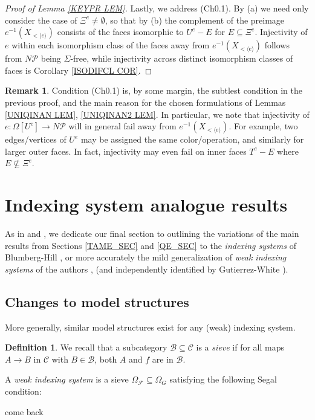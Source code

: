 \documentclass[a4paper,10pt
,draft
]{article}%
\numberwithin{equation}{section}
\numberwithin{figure}{section}
\theoremstyle{definition} %
\newtheorem{definition}[equation]{Definition}%
\newtheorem{remark}[equation]{Remark}%
\newcommand{\F}{\ensuremath{\mathcal F}}
\newcommand{\1}{\ensuremath{\mathbbm 1}}%
\begin{document}
\begin{proof}[Proof of Lemma \ref{KEYPR LEM}]
	
	Lastly, we address (Ch0.1). By (a) we need only consider the case of $\Xi^e \neq \emptyset$,
	so that by (b)
	the complement of
	the preimage
	$e^{-1}(X_{<\langle e\rangle})$
	consists of the faces isomorphic to
	$U^e-E$ for $E \subseteq \Xi^e$.
	Injectivity of $e$ within each isomorphism class of the faces away from %
	$e^{-1}(X_{<\langle e\rangle})$
	follows from $N \mathcal{P}$ being $\Sigma$-free,
	while injectivity across distinct isomorphism classes of faces is
	Corollary \ref{ISODIFCL COR}.
\end{proof}



\begin{remark}
	Condition (Ch0.1) is, by some margin, the subtlest condition in the previous proof, and the main reason for the chosen formulations of 
	Lemmas \ref{UNIQINAN LEM}, \ref{UNIQINAN2 LEM}.
	In particular, we note that injectivity of 
	$e \colon \Omega[U^e] \to N \mathcal{P}$ will in general fail away from 
	$e^{-1}(X_{< \langle e \rangle})$.
	For example, two edges/vertices of $U^e$
	may be assigned the same color/operation, and similarly for larger outer faces. In fact, injectivity may even fail on inner faces
	$T^e-E$ where $E \not \subseteq \Xi^e$.
\end{remark}









\iffalse




\section{Indexing system analogue results}\label{INDSYS SEC}

As in \cite[\S 6]{BP_edss} and \cite[\S 9]{Per18}, we dedicate our final section to 
outlining the variations of the main results from Sections \ref{TAME_SEC} and \ref{QE_SEC} to
the \textit{indexing systems} of Blumberg-Hill \cite{BH15}, or more accurately
the mild generalization of \textit{weak indexing systems} of the authors \cite[\S 9]{Per18}, \cite[\S4.4]{BP_geo} (and independently identified by Gutierrez-White \cite{GW18}).


\subsection{Changes to model structures}
More generally, similar model structures exist for any (weak) indexing system.
\begin{definition}
      We recall that a subcategory $\mathcal B \subseteq \mathcal C$ is a \textit{sieve} if for all maps $A \to B$ in $\mathcal C$
      with $B \in \mathcal B$, both $A$ and $f$ are in $\mathcal B$.

      A \textit{weak indexing system} is a sieve
      $\Omega_\F \subseteq \Omega_G$
      satisfying the following Segal condition:

      come back
\end{definition}
\end{document}
